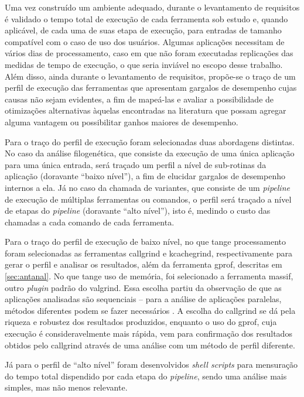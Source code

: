 \documentclass[cic,tc]{iiufrgs}
\begin{document}
Uma vez construído um ambiente adequado, durante o levantamento de requisitos é
validado o tempo total de execução de cada ferramenta sob estudo e, quando
aplicável, de cada uma de suas etapa de execução, para entradas de tamanho
compatível com o caso de uso dos usuários. Algumas aplicações necessitam de
vários dias de processamento, caso em que não foram executadas replicações das
medidas de tempo de execução, o que seria inviável no escopo desse trabalho.
Além disso, ainda durante o levantamento de requisitos, propõe-se o traço de um
perfil de execução das ferramentas que apresentam gargalos de desempenho cujas
causas não sejam evidentes, a fim de mapeá-las e avaliar a possibilidade de
otimizações alternativas àquelas encontradas na literatura que possam agregar
alguma vantagem ou possibilitar ganhos maiores de desempenho.

Para o traço do perfil de execução foram selecionadas duas abordagens
distintas. No caso da análise filogenética, que consiste da execução de uma
única aplicação para uma única entrada, será traçado um perfil a nível de
sub-rotinas da aplicação (doravante ``baixo nível''), a fim de elucidar
gargalos de desempenho internos a ela. Já no caso da chamada de variantes, que
consiste de um \textit{pipeline} de execução de múltiplas ferramentas ou
comandos, o perfil será traçado a nível de etapas do \textit{pipeline}
(doravante ``alto nível''), isto é, medindo o custo das chamadas a cada comando
de cada ferramenta.

Para o traço do perfil de execução de baixo nível, no que tange processamento
foram selecionadas as ferramentas callgrind e kcachegrind, respectivamente para
gerar o perfil e analisar os resultados, além da ferramenta gprof, descritas em
\ref{sec:antanal}. No que tange uso de memória, foi selecionado a ferramenta
massif, outro \textit{plugin} padrão do valgrind. Essa escolha partiu da
observação de que as aplicações analisadas são sequenciais -- para a análise de
aplicações paralelas, métodos diferentes podem se fazer necessários
\cite{weidendorfer2008sequential}. A escolha do callgrind se dá pela riqueza e
robustez dos resultados produzidos, enquanto o uso do gprof, cuja execução é
consideravelmente mais rápida, vem para confirmação dos resultados obtidos pelo
callgrind através de uma análise com um método de perfil diferente.

Já para o perfil de ``alto nível'' foram desenvolvidos \textit{shell scripts}
para mensuração do tempo total dispendido por cada etapa do \textit{pipeline},
sendo uma análise mais simples, mas não menos relevante.
\end{document}
